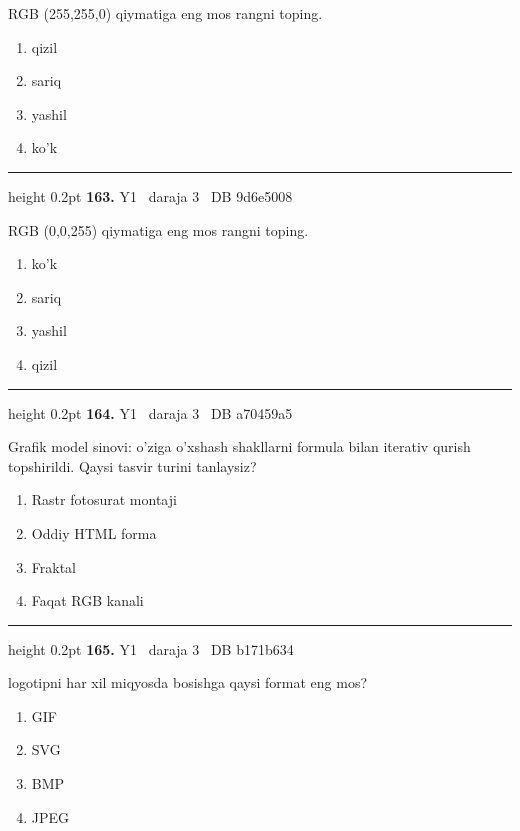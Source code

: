 \documentclass[10pt,a4paper,oneside]{article}
\begin{document}
\par
RGB (255,255,0) qiymatiga eng mos rangni toping.
\begin{enumerate}[label=\Alph*),leftmargin=9mm]
\item qizil
\item sariq
\item yashil
\item ko'k
\end{enumerate}
\vspace{2mm}\hrule height 0.2pt \vspace{4mm}
\hypertarget{q163}{\textbf{\color{ink}163.}}  {\color{muted}\scriptsize Y1 \textbullet\ daraja 3 \textbullet\ DB 9d6e5008}
\par
RGB (0,0,255) qiymatiga eng mos rangni toping.
\begin{enumerate}[label=\Alph*),leftmargin=9mm]
\item ko'k
\item sariq
\item yashil
\item qizil
\end{enumerate}
\vspace{2mm}\hrule height 0.2pt \vspace{4mm}
\hypertarget{q164}{\textbf{\color{ink}164.}}  {\color{muted}\scriptsize Y1 \textbullet\ daraja 3 \textbullet\ DB a70459a5}
\par
Grafik model sinovi: o'ziga o'xshash shakllarni formula bilan iterativ qurish topshirildi. Qaysi tasvir turini tanlaysiz?
\begin{enumerate}[label=\Alph*),leftmargin=9mm]
\item Rastr fotosurat montaji
\item Oddiy HTML forma
\item Fraktal
\item Faqat RGB kanali
\end{enumerate}
\vspace{2mm}\hrule height 0.2pt \vspace{4mm}
\hypertarget{q165}{\textbf{\color{ink}165.}}  {\color{muted}\scriptsize Y1 \textbullet\ daraja 3 \textbullet\ DB b171b634}
\par
logotipni har xil miqyosda bosishga qaysi format eng mos?
\begin{enumerate}[label=\Alph*),leftmargin=9mm]
\item GIF
\item SVG
\item BMP
\item JPEG
\end{enumerate}
\end{document}
